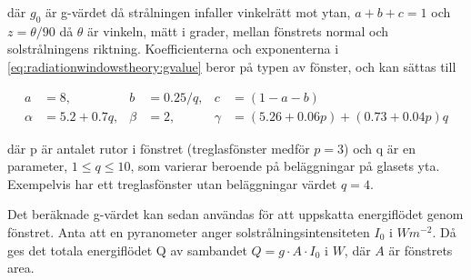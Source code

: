 där $g_0$ är g-värdet då strålningen infaller vinkelrätt mot ytan, $a+b+c=1$ och $z=\theta/90$ då $\theta$ är vinkeln, mätt i grader, mellan fönstrets normal och solstrålningens riktning. Koefficienterna och exponenterna i \eqref{eq:radiationwindowstheory:gvalue} beror på typen av fönster, och kan sättas till

\begin{align}\label{eq:gconstants}
a & = 8, & b & = 0.25/q, & c & = (1-a-b) \nonumber \\
\alpha & = 5.2 + 0.7q, & \beta & = 2, & \gamma & = (5.26+0.06p) + (0.73+0.04p)q
\end{align}

där p är antalet rutor i fönstret (treglasfönster medför $p = 3$) och q är en parameter, $1 \le q \le 10$, som varierar beroende på beläggningar på glasets yta. Exempelvis har ett treglasfönster utan beläggningar värdet $q=4$.

Det beräknade g-värdet kan sedan användas för att uppskatta energiflödet genom fönstret. Anta att en pyranometer anger solstrålningsintensiteten $I_0$ i $\unit{W m^{-2}}$. Då ges det totala energiflödet Q av sambandet $Q = g \cdot A \cdot I_0$ i $\unit{W}$, där $A$ är fönstrets area.
